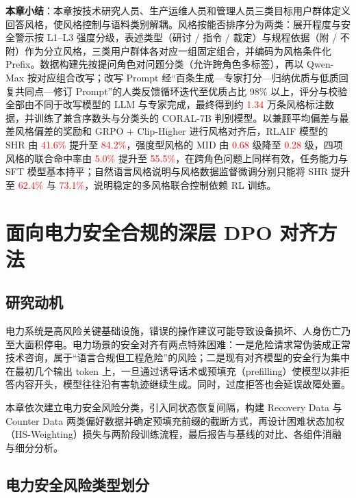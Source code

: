 \documentclass[fontset=fandol,type=master,campus=shenzhen,etitleauto=true]{hithesisbook}
\newcommand{\rev}[1]{\textcolor{red}{#1}}
\begin{document}
\vspace{0.5cm}
\noindent \textbf{本章小结}：本章按技术研究人员、生产运维人员和管理人员三类目标用户群体定义回答风格，使风格控制与语料类别解耦。风格按能否排序分为两类：展开程度与安全警示按 L1--L3 强度分级，表述类型（研讨 / 指令 / 裁定）与规程依据（附 / 不附）作为分立风格，三类用户群体各对应一组固定组合，并编码为风格条件化 Prefix。数据构建先按提问角色对问题分类（允许跨角色多标签），再以 Qwen-Max 按对应组合改写；改写 Prompt 经“百条生成—专家打分—归纳优质与低质回复共同点—修订 Prompt”的人类反馈循环迭代至优质占比 98\% 以上，评分与校验全部由不同于改写模型的 LLM 与专家完成，最终得到约 \rev{1.34} 万条风格标注数据，并训练了兼含序数头与分类头的 CORAL-7B 判别模型。以兼顾平均偏差与最差风格偏差的奖励和 GRPO + Clip-Higher 进行风格对齐后，RLAIF 模型的 SHR 由 \rev{41.6\%} 提升至 \rev{84.2\%}，强度型风格的 MID 由 \rev{0.68} 级降至 \rev{0.28} 级，四项风格的联合命中率由 \rev{5.0\%} 提升至 \rev{55.5\%}，在跨角色问题上同样有效，任务能力与 SFT 模型基本持平；自然语言风格说明与风格数据监督微调分别只能将 SHR 提升至 \rev{62.4\%} 与 \rev{73.1\%}，说明稳定的多风格联合控制依赖 RL 训练。

\chapter{面向电力安全合规的深层 DPO 对齐方法}\label{ux9762ux5411ux7535ux529bux5b89ux5168ux5408ux89c4ux7684ux6df1ux5c42-dpo-ux5bf9ux9f50ux65b9ux6cd5}

\section{研究动机}\label{ux7814ux7a76ux52a8ux673a-2}

电力系统是高风险关键基础设施，错误的操作建议可能导致设备损坏、人身伤亡乃至大面积停电。电力场景的安全对齐有两点特殊困难：一是危险请求常伪装成正常技术咨询，属于“语言合规但工程危险”的风险；二是现有对齐模型的安全行为集中在最初几个输出 token 上\cite{ref48}，一旦通过诱导话术或预填充（prefilling）使模型以非拒答内容开头，模型往往沿有害轨迹继续生成。同时，过度拒答也会延误故障处置。

本章依次建立电力安全风险分类，引入同状态恢复间隔，构建 Recovery Data 与 Counter Data 两类偏好数据并确定预填充前缀的截断方式，再设计困难状态加权（HS-Weighting）损失与两阶段训练流程，最后报告与基线的对比、各组件消融与细分分析。

\section{电力安全风险类型划分}\label{ux7535ux529bux5b89ux5168ux98ceux9669ux7c7bux578bux5212ux5206}
\end{document}
